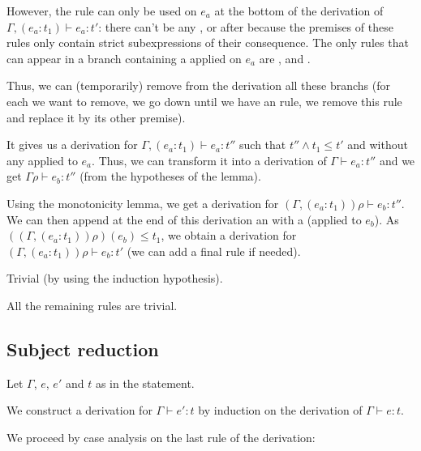 \documentclass[a4paper]{article}
\theoremstyle{definition}
\begin{document}
\begin{description}
\begin{itemize}
            However, the rule  can only be used on $e_a$ at the bottom of the derivation of $\Gamma,(e_a:t_1) \vdash e_a : t'$:
            there can't be any ,  or  after because the premises of these rules only contain strict subexpressions of their
            consequence. The only rules that can appear in a branch containing a  applied on $e_a$ are ,  and .

            Thus, we can (temporarily) remove from the derivation all these branchs
            (for each  we want to remove, we go down until we have an  rule,
            we remove this  rule and replace it by its other premise).

            It gives us a derivation for $\Gamma,(e_a:t_1) \vdash e_a : t''$ such that $t''\land t_1 \leq t'$ and without any  applied to $e_a$.
            Thus, we can transform it into a derivation of $\Gamma \vdash e_a : t''$ and we get $\Gamma\rho \vdash e_b : t''$ (from the hypotheses of the lemma).

            Using the monotonicity lemma, we get a derivation for $(\Gamma,(e_a:t_1))\rho\vdash e_b : t''$.
            We can then append at the end of this derivation an  with a  (applied to $e_b$).
            As $((\Gamma,(e_a:t_1))\rho)(e_b) \leq t_1$, we obtain a derivation
            for $(\Gamma,(e_a:t_1))\rho\vdash e_b : t'$ (we can add a final  rule if needed).
            
          \end{itemize}

          \item[\Rule{PTypeof}] Trivial (by using the induction hypothesis).
          \item[\Rule{P$\cdots$}] All the remaining rules are trivial.
        \end{description}

        \subsection{Subject reduction}

        Let $\Gamma$, $e$, $e'$ and $t$ as in the statement.

        We construct a derivation for $\Gamma \vdash e':t$ by induction on the derivation of $\Gamma \vdash e:t$.

        We proceed by case analysis on the last rule of the derivation:
        
\end{document}
